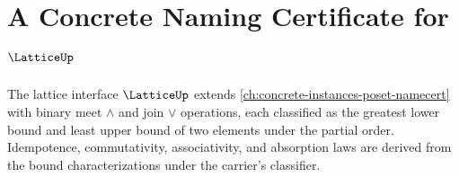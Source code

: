 \chapter{A Concrete Naming Certificate for \(\LatticeUp\)}
\label{ch:concrete-instances-lattice-namecert}

The lattice interface \(\LatticeUp\) extends \autoref{ch:concrete-instances-poset-namecert} with binary meet \(\wedge\) and join \(\vee\) operations, each classified as the greatest lower bound and least upper bound of two elements under the partial order. Idempotence, commutativity, associativity, and absorption laws are derived from the bound characterizations under the carrier's classifier.







